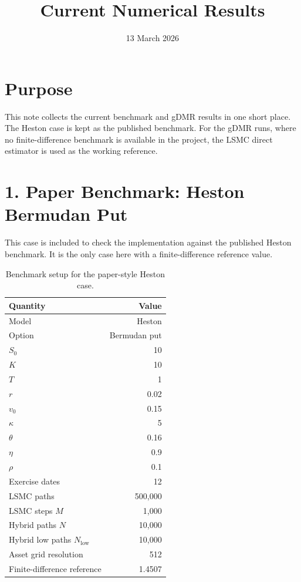 \documentclass[11pt]{article}
\title{Current Numerical Results}
\author{}
\date{13 March 2026}
\begin{document}
\maketitle

\section*{Purpose}

This note collects the current benchmark and gDMR results in one short place.
The Heston case is kept as the published benchmark.
For the gDMR runs, where no finite-difference benchmark is available in the project,
the LSMC direct estimator is used as the working reference.

\section*{1. Paper Benchmark: Heston Bermudan Put}

This case is included to check the implementation against the published Heston benchmark.
It is the only case here with a finite-difference reference value.

\begin{table}[htbp]
\centering
\caption{Benchmark setup for the paper-style Heston case.}
\begin{tabular}{lr}
\toprule
Quantity & Value \\
\midrule
Model & Heston \\
Option & Bermudan put \\
$S_0$ & 10 \\
$K$ & 10 \\
$T$ & 1 \\
$r$ & 0.02 \\
$v_0$ & 0.15 \\
$\kappa$ & 5 \\
$\theta$ & 0.16 \\
$\eta$ & 0.9 \\
$\rho$ & 0.1 \\
Exercise dates & 12 \\
LSMC paths & 500,000 \\
LSMC steps $M$ & 1,000 \\
Hybrid paths $N$ & 10,000 \\
Hybrid low paths $N_{\mathrm{low}}$ & 10,000 \\
Asset grid resolution & 512 \\
Finite-difference reference & 1.4507 \\
\bottomrule
\end{tabular}
\end{table}
\end{document}
